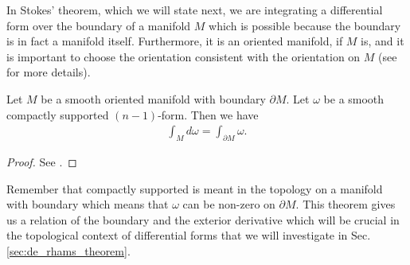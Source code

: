 \documentclass[../master_thesis.tex]{subfiles}
\begin{document}
In Stokes' theorem, which we will state next, we are integrating a differential 
form over the boundary of a manifold $M$ which is possible because the boundary is in fact 
a manifold itself. Furthermore, it is an oriented manifold, if $M$ is, and it is 
important to choose the orientation consistent with the orientation on $M$
(see \cite[Sec.\,V.4]{topology_and_geometry} for more details). 

\begin{theorem}[Stokes]
    Let $M$ be a smooth oriented manifold with boundary 
    $\partial M$. Let $\omega$ be 
    a smooth compactly supported $(n-1)$-form. Then we have 
    \begin{align*}
        \int_M d\omega = \int_{\partial M} \omega.
    \end{align*}
\end{theorem}
\begin{proof}
    See \cite[Sec.\,V.4]{topology_and_geometry}.
\end{proof}
Remember that compactly supported is meant in the topology on a manifold with 
boundary which means that $\omega$ can be non-zero on $\partial M$. 
This theorem gives us a relation of the boundary and the exterior derivative 
which will be crucial in the topological context of differential forms 
that we will investigate in Sec.\,\ref{sec:de_rhams_theorem}. 
\end{document}
